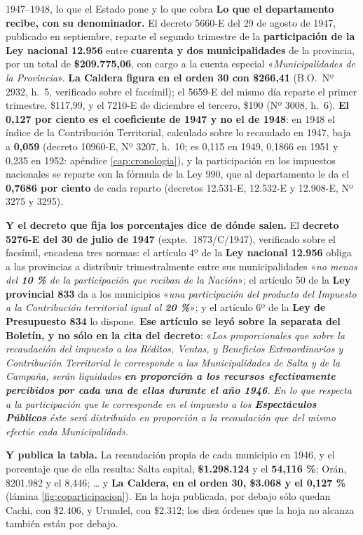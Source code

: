\begin{ficha}{1947--1948, lo que el Estado pone y lo que cobra}
\textbf{Lo que el departamento recibe, con su denominador.} El decreto 5660-E del 29 de agosto
de 1947, publicado en septiembre, reparte el segundo trimestre de la \textbf{participación de la Ley nacional 12.956} entre \textbf{cuarenta y dos
municipalidades} de la provincia, por un total de \textbf{\$209.775,06}, con cargo a la cuenta
especial «\textit{Municipalidades de la Provincia}». \textbf{La Caldera figura en el orden 30
con \$266,41} (B.O.\ Nº 2932, h.\ 5, verificado sobre el facsímil); el 5659-E del mismo día reparte
el primer trimestre, \$117,99, y el 7210-E de diciembre el tercero, \$190 (Nº 3008, h.\ 6).
\textbf{El 0,127 por ciento es el coeficiente de 1947 y no el de 1948}: en 1948 el índice de la
Contribución Territorial, calculado sobre lo recaudado en 1947, baja a \textbf{0,059} (decreto
10960-E, Nº 3207, h.\ 10; es 0,115 en 1949, 0,1866 en 1951 y 0,235 en 1952: apéndice \ref{cap:cronologia}), y la participación en los impuestos nacionales se reparte con la fórmula
de la Ley 990, que al departamento le da el \textbf{0,7686 por ciento} de cada reparto (decretos
12.531-E, 12.532-E y 12.908-E, Nº 3275 y 3295).

\textbf{Y el decreto que fija los porcentajes dice de dónde salen.} El \textbf{decreto 5276-E
del 30 de julio de 1947} (expte.\ 1873/C/1947), verificado sobre el facsímil, encadena tres
normas: el artículo 4º de la \textbf{Ley nacional 12.956} obliga a las provincias a distribuir
trimestralmente entre sus municipalidades «\textit{no menos del \textbf{10 \%} de la
participación que reciban de la Nación}»; el artículo 50 de la \textbf{Ley provincial 833} da
a los municipios «\textit{una participación del producto del Impuesto a la Contribución
territorial igual al \textbf{20 \%}}»; y el artículo 6º de la \textbf{Ley de Presupuesto 834} lo dispone.
\textbf{Ese artículo se leyó sobre la separata del Boletín, y no sólo en la cita del
decreto}: «\textit{Los proporcionales que sobre la recaudación del impuesto a los Réditos,
Ventas, y Beneficios Extraordinarios y Contribución Territorial le corresponde a las
Municipalidades de Salta y de la Campaña, serán liquidados \textbf{en proporción a los
recursos efectivamente percibidos por cada una de ellas durante el año 1946}. En lo que
respecta a la participación que le corresponde en el impuesto a los \textbf{Espectáculos
Públicos} éste será distribuido en proporción a la recaudación que del mismo efectúe cada
Municipalidad}».

\textbf{Y publica la tabla.} La recaudación propia de cada municipio en 1946, y el porcentaje
que de ella resulta: Salta capital, \textbf{\$1.298.124} y el \textbf{54,116 \%}; Orán,
\$201.982 y el 8,446; \ldots{} y \textbf{La Caldera, en el orden 30, \$3.068 y el
\textbf{0,127 \%}} (lámina \ref{fig:coparticipacion}). En la hoja publicada, por debajo sólo quedan Cachi, con \$2.406, y Urundel, con \$2.312; los diez órdenes que la hoja no alcanza también están por debajo.


\end{ficha}
